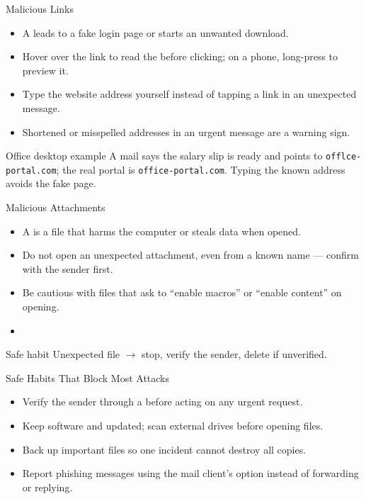 \documentclass[aspectratio=169]{beamer}
\begin{document}
\begin{frame}{Malicious Links}
  \begin{itemize}
    \item A  leads to a fake login page or starts an
      unwanted download.
    \item Hover over the link to read the  before
      clicking; on a phone, long-press to preview it.
    \item Type the website address yourself instead of tapping a link in
      an unexpected message.
    \item Shortened or misspelled addresses in an urgent message are a
      warning sign.
  \end{itemize}
  \begin{exampleblock}{Office desktop example}
    A mail says the salary slip is ready and points to
    \texttt{offlce-portal.com}; the real portal is
    \texttt{office-portal.com}. Typing the known address avoids the
    fake page.
  \end{exampleblock}
\end{frame}

\begin{frame}{Malicious Attachments}
  \begin{itemize}
    \item A  is a file that harms the computer
      or steals data when opened.
    \item Do not open an unexpected attachment, even from a known name
      --- confirm with the sender first.
    \item Be cautious with files that ask to ``enable macros'' or
      ``enable content'' on opening.
    \item {}
  \end{itemize}
  \begin{block}{Safe habit}
    Unexpected file $\rightarrow$ stop, verify the sender, delete if
    unverified.
  \end{block}
\end{frame}

\begin{frame}{Safe Habits That Block Most Attacks}
  \begin{itemize}
    \item Verify the sender through a  before acting
      on any urgent request.
    \item Keep software and  updated; scan external
      drives before opening files.
    \item Back up important files so one incident cannot destroy all
      copies.
    \item Report phishing messages using the mail client's
       option instead of forwarding or replying.
  \end{itemize}
\end{frame}
\end{document}
